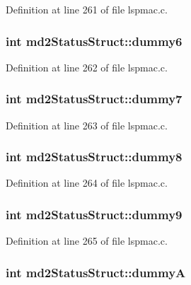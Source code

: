 Definition at line 261 of file lspmac.c.\hypertarget{structmd2StatusStruct_a864a2234ede061ec2380230ebf29ce70}{
\subsubsection[{dummy6}]{\setlength{\rightskip}{0pt plus 5cm}int {\bf md2StatusStruct::dummy6}}}
\label{structmd2StatusStruct_a864a2234ede061ec2380230ebf29ce70}


Definition at line 262 of file lspmac.c.\hypertarget{structmd2StatusStruct_a91f38d814222edeffa67a6a3ab61f5d6}{
\subsubsection[{dummy7}]{\setlength{\rightskip}{0pt plus 5cm}int {\bf md2StatusStruct::dummy7}}}
\label{structmd2StatusStruct_a91f38d814222edeffa67a6a3ab61f5d6}


Definition at line 263 of file lspmac.c.\hypertarget{structmd2StatusStruct_a17f44367cfa4c66ec3ee481863ef4960}{
\subsubsection[{dummy8}]{\setlength{\rightskip}{0pt plus 5cm}int {\bf md2StatusStruct::dummy8}}}
\label{structmd2StatusStruct_a17f44367cfa4c66ec3ee481863ef4960}


Definition at line 264 of file lspmac.c.\hypertarget{structmd2StatusStruct_aa5aadda5a5cb98c6028f8b45e16cd084}{
\subsubsection[{dummy9}]{\setlength{\rightskip}{0pt plus 5cm}int {\bf md2StatusStruct::dummy9}}}
\label{structmd2StatusStruct_aa5aadda5a5cb98c6028f8b45e16cd084}


Definition at line 265 of file lspmac.c.\hypertarget{structmd2StatusStruct_a9fc7dc802d00c22463dd7ddd531e06d7}{
\subsubsection[{dummyA}]{\setlength{\rightskip}{0pt plus 5cm}int {\bf md2StatusStruct::dummyA}}}
\label{structmd2StatusStruct_a9fc7dc802d00c22463dd7ddd531e06d7}


